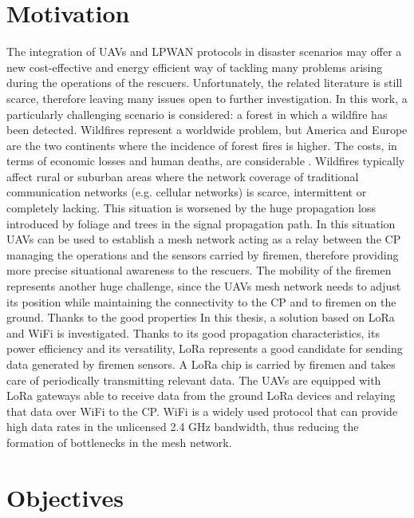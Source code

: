 \section{Motivation}
\label{sec:motivation}

The integration of \glspl{UAV} and \gls{LPWAN} protocols in disaster scenarios may offer a new cost-effective and energy efficient way of tackling many problems arising during the operations of the rescuers. Unfortunately, the related literature is still scarce, therefore leaving many issues open to further investigation. In this work, a particularly challenging scenario is considered: a forest in which a wildfire has been detected.
Wildfires represent a worldwide problem, but America and Europe are the two continents where the incidence of forest fires is higher. The costs, in terms of economic losses and human deaths, are considerable \cite{ref:disasters-report} \cite{ref:wildfires-figures}.
Wildfires typically affect rural or suburban areas where the network coverage of traditional communication networks (e.g. cellular networks) is scarce, intermittent or completely lacking. This situation is worsened by the huge propagation loss introduced by foliage and trees in the signal propagation path. In this situation \glspl{UAV} can be used to establish a mesh network acting as a relay between the \gls{CP} managing the operations and the sensors carried by firemen, therefore providing more precise situational awareness to the rescuers. The mobility of the firemen represents another huge challenge, since the \glspl{UAV} mesh network needs to adjust its position while maintaining the connectivity to the \gls{CP} and to firemen on the ground. 
Thanks to the good properties
In this thesis, a solution based on LoRa and WiFi is investigated. Thanks to its good propagation characteristics, its power efficiency and its versatility, LoRa represents a good candidate for sending data generated by firemen sensors. A LoRa chip is carried by firemen and takes care of periodically transmitting relevant data. The \glspl{UAV} are equipped with LoRa gateways able to receive data from the ground LoRa devices and relaying that data over WiFi to the \gls{CP}. WiFi is a widely used protocol that can provide high data rates in the unlicensed 2.4 GHz bandwidth, thus reducing the formation of bottlenecks in the mesh network.

\section{Objectives}

